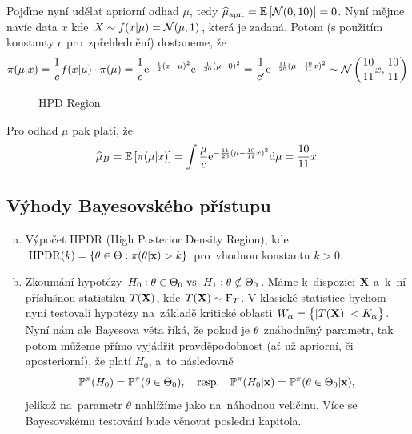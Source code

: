 \begin{example}
\begin{enumerate}[a)]
	
	Pojďme nyní udělat apriorní odhad $\mu$, tedy $\widehat{\mu}_{\mathrm{apr.}}=\mathbb{E}\left[ \mathcal{N}(0,10) \right]=0$. Nyní mějme navíc data $x$ kde $X\sim f(x|\mu)=\mathcal{N}(\mu,1)$, která je zadaná. Potom (s použitím konstanty $c$ pro~zpřehlednění) dostaneme, že
	$$ \pi(\mu|x)=\frac{1}{c}f(x|\mu)\cdot\pi(\mu)=\frac{1}{c}\mathrm{e}^{-\frac{1}{2}(x-\mu)^2}\mathrm{e}^{-\frac{1}{20}(\mu-0)^2}=\frac{1}{c'}\mathrm{e}^{-\frac{11}{20}(\mu-\frac{10}{11}x)^2}\sim \mathcal{N}\left(\frac{10}{11}x,\frac{10}{11}\right)$$ 	\begin{figure}[h]
		\centering
		\caption{HPD Region.}
	\end{figure}

	Pro odhad $\mu$ pak platí, že
	$$\widehat{\mu}_B=\mathbb{E}\left[ \pi(\mu|x) \right]=\int\frac{\mu}{c}\mathrm{e}^{-\frac{11}{20}(\mu-\frac{10}{11}x)^2}\mathrm{d}\mu=\frac{10}{11}x.$$ 
		\end{enumerate}
\end{example}

	\subsection*{Výhody Bayesovského přístupu}
\begin{enumerate}[a)]
	\item Výpočet HPDR (High Posterior Density Region), kde $\mathrm{HPDR}(k)=\{\theta\in\Theta:\pi(\theta|\textbf{x})>k\}$ pro~vhodnou konstantu $k>0$.


	
	\item Zkoumání hypotézy $H_0: \theta\in\Theta_0 ~\text{vs.}~ H_1: \theta\notin\Theta_0$. Máme k~dispozici $\textbf{X}$ a~k~ní příslušnou statistiku $T(\textbf{X})$, kde $T(\textbf{X})\sim\mathrm{F}_T$. V klasické statistice bychom nyní testovali hypotézy na~základě kritické oblasti $W_\alpha=\big\{ |T(\textbf{X})|<K_\alpha \big\}$. Nyní nám ale Bayesova věta říká, že pokud je $\theta$ znáhodněný parametr, tak potom můžeme přímo vyjádřit pravděpodobnost (ať už apriorní, či aposteriorní), že platí $H_0$, a~to následovně
	$$\mathbb{P}^\pi(H_0) = \mathbb{P}^\pi(\theta \in \Theta_0),\quad\text{resp.}\quad \mathbb{P}^\pi(H_0|\textbf{x})=\mathbb{P}^\pi(\theta\in\Theta_0|\textbf{x}),$$
	jelikož na~parametr $\theta$ nahlížíme jako na~náhodnou veličinu. Více se Bayesovskému testování bude věnovat poslední kapitola.

\end{enumerate}


